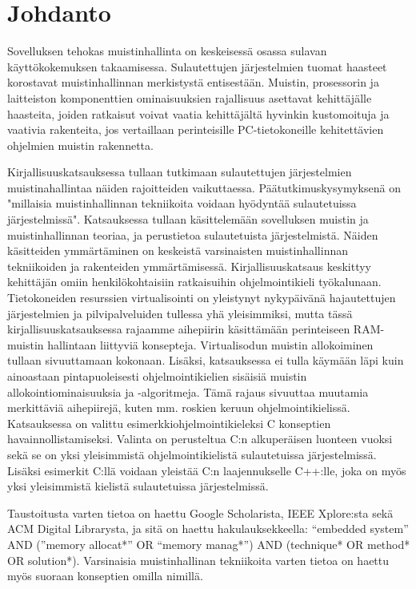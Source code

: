 \chapter{Johdanto} \label{Johdanto}

Sovelluksen tehokas muistinhallinta on keskeisessä osassa sulavan käyttökokemuksen takaamisessa. Sulautettujen järjestelmien tuomat haasteet korostavat muistinhallinnan merkistystä entisestään. Muistin, prosessorin ja laitteiston komponenttien ominaisuuksien rajallisuus asettavat kehittäjälle haasteita, joiden ratkaisut voivat vaatia kehittäjältä hyvinkin kustomoituja ja vaativia rakenteita, jos vertaillaan perinteisille PC-tietokoneille kehitettävien ohjelmien muistin rakennetta.

Kirjallisuuskatsauksessa tullaan tutkimaan sulautettujen järjestelmien muistinahallintaa näiden rajoitteiden vaikuttaessa. Päätutkimuskysymyksenä on "millaisia muistinhallinnan tekniikoita voidaan hyödyntää sulautetuissa järjestelmissä". Katsauksessa tullaan käsittelemään sovelluksen muistin ja muistinhallinnan teoriaa, ja perustietoa sulautetuista järjestelmistä. Näiden käsitteiden ymmärtäminen on keskeistä varsinaisten muistinhallinnan tekniikoiden ja rakenteiden ymmärtämisessä. Kirjallisuuskatsaus keskittyy kehittäjän omiin henkilökohtaisiin ratkaisuihin ohjelmointikieli työkalunaan. Tietokoneiden resurssien virtualisointi on yleistynyt nykypäivänä hajautettujen järjestelmien ja pilvipalveluiden tullessa yhä yleisimmiksi, mutta tässä kirjallisuuskatsauksessa rajaamme aihepiirin käsittämään perinteiseen RAM-muistin hallintaan liittyviä konsepteja. Virtualisodun muistin allokoiminen tullaan sivuuttamaan kokonaan. Lisäksi, katsauksessa ei tulla käymään läpi kuin ainoastaan pintapuoleisesti ohjelmointikielien sisäisiä muistin allokointiominaisuuksia ja -algoritmeja. Tämä rajaus sivuuttaa muutamia merkittäviä aihepiirejä, kuten mm. roskien keruun ohjelmointikielissä. Katsauksessa on valittu esimerkkiohjelmointikieleksi C konseptien havainnollistamiseksi. Valinta on perusteltua C:n alkuperäisen luonteen vuoksi sekä se on yksi yleisimmistä ohjelmointikielistä sulautetuissa järjestelmissä. Lisäksi esimerkit C:llä voidaan yleistää C:n laajennukselle C++:lle, joka on myös yksi yleisimmistä kielistä sulautetuissa järjestelmissä.

Taustoitusta varten tietoa on haettu Google Scholarista, IEEE Xplore:sta sekä ACM Digital Librarysta, ja sitä on haettu hakulauksekkeella: “embedded system” AND (”memory allocat*” OR “memory manag*”) AND (technique* OR method* OR solution*). Varsinaisia muistinhallinan tekniikoita varten tietoa on haettu myös suoraan konseptien omilla nimillä.